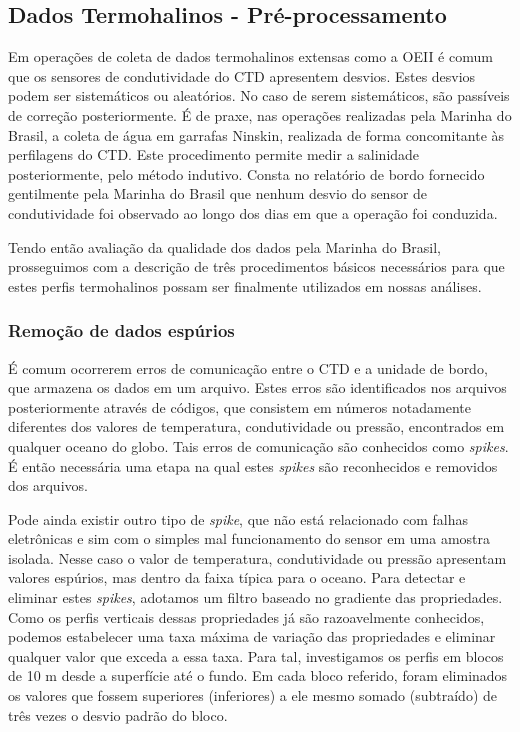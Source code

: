 \subsection{Dados Termohalinos - Pré-processamento}\label{sec:CTD}

\hspace{6mm} Em operações de coleta de dados termohalinos extensas como a OEII
é comum que os sensores de condutividade do CTD apresentem desvios. 
Estes desvios podem ser sistemáticos
ou aleatórios. No caso de serem sistemáticos, são passíveis de correção posteriormente. 
É de praxe, nas operações realizadas
pela Marinha do Brasil, a coleta de água em garrafas Ninskin, realizada de forma 
concomitante às perfilagens do CTD. Este procedimento permite medir a salinidade
posteriormente, pelo método indutivo. Consta no relatório de bordo fornecido gentilmente 
pela Marinha do Brasil que nenhum desvio do sensor de condutividade foi observado
ao longo dos dias em que a operação foi conduzida.

Tendo então avaliação da qualidade dos dados pela Marinha do Brasil, prosseguimos com a des\-cri\-ção de três 
procedimentos básicos necessários para que estes perfis termohalinos possam ser finalmente
utilizados em nossas análises. 

\subsubsection{Remoção de dados espúrios}\label{sec:spikes}

\hspace{6mm} É comum ocorrerem erros de comunicação entre o CTD e a unidade
de bordo, que armazena os dados em um arquivo. Estes erros são identificados nos arquivos
posteriormente através de códigos, que consistem em números notadamente diferentes dos 
valores de temperatura, condutividade ou pressão, encontrados em qualquer oceano do globo.
Tais erros de comunicação são conhecidos como {\it spikes}. É então necessária uma etapa
na qual estes {\it spikes} são reconhecidos e removidos dos arquivos.  

Pode ainda existir outro tipo de {\it spike}, que não está relacionado com falhas
e\-le\-trô\-ni\-cas e sim com o simples mal funcionamento do sensor em uma amostra isolada. Nesse caso
o valor de temperatura, condutividade ou pressão apresentam valores espúrios, mas dentro da faixa
típica para o oceano. Para detectar e eliminar estes {\it spikes}, adotamos um filtro baseado no
gradiente das propriedades. Como os perfis verticais dessas propriedades já são razoavelmente conhecidos, 
podemos estabelecer uma taxa máxima de variação das propriedades e eliminar qualquer valor que exceda
a essa taxa. Para tal, investigamos os perfis em blocos de 10 m desde a superfície até o fundo.
Em cada bloco referido, foram eliminados os valores que fossem superiores (inferiores) a ele mesmo 
somado (subtraído) de três vezes o desvio padrão do bloco. 

